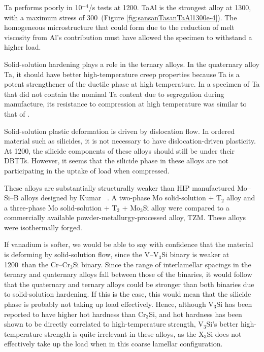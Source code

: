 Ta performs poorly in 10$^{-4}$/s tests at 1200\celsius.
TaAl is the strongest alloy at 1300\celsius, with a maximum stress of 300\mega\pascal\ (Figure \ref{fig:sansanTasanTaAl1300e-4}).  The homogeneous microstructure that could form due to the reduction of melt viscosity from Al's contribution must have allowed the specimen to withstand a higher load.

Solid-solution hardening plays a role in the ternary alloys.  In the quaternary alloy Ta, it should have better high-temperature creep properties because Ta is a potent strengthener of the ductile phase at high temperature.  In a specimen of Ta that did not contain the nominal Ta content due to segregation during manufacture, its resistance to compression at high temperature was similar to that of .

Solid-solution plastic deformation is driven by dislocation flow.  In ordered material such as silicides, it is not necessary to have dislocation-driven plasticity.  At 1200\celsius, the silicide components of these alloys should still be under their DBTTs.  However, it seems that the silicide phase in these alloys are not participating in the uptake of load when compressed.  

These alloys are substantially structurally weaker than HIP manufactured Mo--Si--B alloys designed by Kumar ~\cite{jain10, alur04}.  A two-phase Mo solid-solution + T$_2$ alloy and a three-phase Mo solid-solution + T$_2$ + Mo$_3$Si alloy were compared to a commercially available powder-metallurgy-processed alloy, TZM.  These alloys were isothermally forged.



If vanadium is softer, we would be able to say with confidence that the material is deforming by solid-solution flow, since the V--V$_3$Si binary is weaker at 1200\celsius\ than the Cr--Cr$_3$Si binary.  Since the range of interlamellar spacings in the ternary and quaternary alloys fall between those of the binaries, it would follow that the quaternary and ternary alloys could be stronger than both binaries due to solid-solution hardening.  If this is the case, this would mean that the silicide phase is probably not taking up load effectively.  Hence, although V$_3$Si has been reported to have higher hot hardness than Cr$_3$Si, and hot hardness has been shown to be directly correlated to high-temperature strength, V$_3$Si's better high-temperature strength is quite irrelevant in these alloys, as the X$_3$Si does not effectively take up the load when in this coarse lamellar configuration. 

